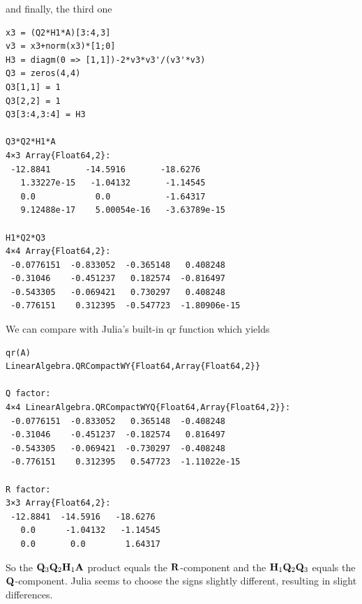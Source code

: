 and finally, the third one

\begin{verbatim}
x3 = (Q2*H1*A)[3:4,3]
v3 = x3+norm(x3)*[1;0]
H3 = diagm(0 => [1,1])-2*v3*v3'/(v3'*v3)
Q3 = zeros(4,4)
Q3[1,1] = 1
Q3[2,2] = 1
Q3[3:4,3:4] = H3

Q3*Q2*H1*A
4×3 Array{Float64,2}:
 -12.8841       -14.5916       -18.6276     
   1.33227e-15   -1.04132       -1.14545    
   0.0            0.0           -1.64317    
   9.12488e-17    5.00054e-16   -3.63789e-15

H1*Q2*Q3
4×4 Array{Float64,2}:
 -0.0776151  -0.833052  -0.365148   0.408248   
 -0.31046    -0.451237   0.182574  -0.816497   
 -0.543305   -0.069421   0.730297   0.408248   
 -0.776151    0.312395  -0.547723  -1.80906e-15
\end{verbatim}

We can compare with Julia's built-in qr function which yields

\begin{verbatim}
qr(A)
LinearAlgebra.QRCompactWY{Float64,Array{Float64,2}}

Q factor:
4×4 LinearAlgebra.QRCompactWYQ{Float64,Array{Float64,2}}:
 -0.0776151  -0.833052   0.365148  -0.408248   
 -0.31046    -0.451237  -0.182574   0.816497   
 -0.543305   -0.069421  -0.730297  -0.408248   
 -0.776151    0.312395   0.547723  -1.11022e-15

R factor:
3×3 Array{Float64,2}:
 -12.8841  -14.5916   -18.6276 
   0.0      -1.04132   -1.14545
   0.0       0.0        1.64317
\end{verbatim}

So the $\mathbf{Q}_3 \mathbf{Q}_2 \mathbf{H}_1 \mathbf{A}$ product equals the $\mathbf{R}$-component and the $\mathbf{H}_1 \mathbf{Q}_2 \mathbf{Q}_3$ equals the $\mathbf{Q}$-component. Julia seems to choose the signs slightly different, resulting in slight differences.


